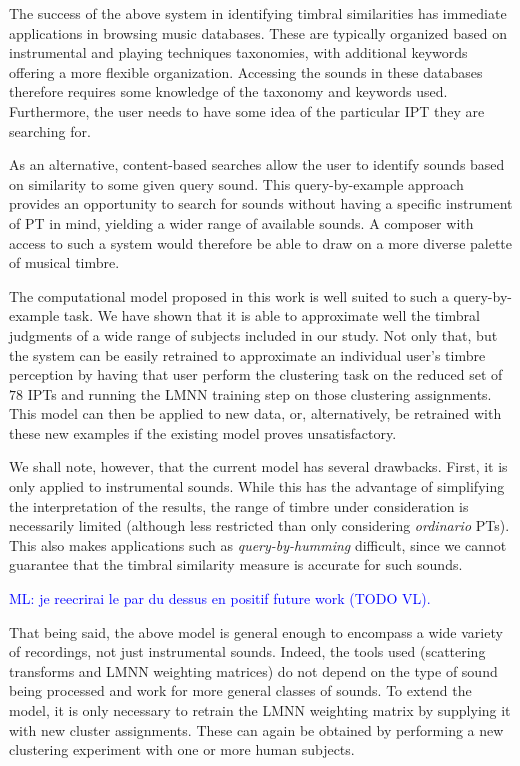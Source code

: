 \documentclass{bmcart}
\newcommand{\ml}[1]{\textcolor{blue}{ML: #1}\xspace}
\begin{document}
The success of the above system in identifying timbral similarities has immediate applications in browsing music databases.
These are typically organized based on instrumental and playing techniques taxonomies, with additional keywords offering a more flexible organization.
Accessing the sounds in these databases therefore requires some knowledge of the taxonomy and keywords used.
Furthermore, the user needs to have some idea of the particular IPT they are searching for.

As an alternative, content-based searches allow the user to identify sounds based on similarity to some given query sound.
This query-by-example approach provides an opportunity to search for sounds without having a specific instrument of PT in mind, yielding a wider range of available sounds.
A composer with access to such a system would therefore be able to draw on a more diverse palette of musical timbre.

The computational model proposed in this work is well suited to such a query-by-example task.
We have shown that it is able to approximate well the timbral judgments of a wide range of subjects included in our study.
Not only that, but the system can be easily retrained to approximate an individual user's timbre perception by having that user perform the clustering task on the reduced set of $78$ IPTs and running the LMNN training step on those clustering assignments.
This model can then be applied to new data, or, alternatively, be retrained with these new examples if the existing model proves unsatisfactory.

We shall note, however, that the current model has several drawbacks.
First, it is only applied to instrumental sounds.
While this has the advantage of simplifying the interpretation of the results, the range of timbre under consideration is necessarily limited (although less restricted than only considering \emph{ordinario} PTs).
This also makes applications such as \emph{query-by-humming} difficult, since we cannot guarantee that the timbral similarity measure is accurate for such sounds.

\ml{je reecrirai le par du dessus en positif future work (TODO VL).}

That being said, the above model is general enough to encompass a wide variety of recordings, not just instrumental sounds.
Indeed, the tools used (scattering transforms and LMNN weighting matrices) do not depend on the type of sound being processed and work for more general classes of sounds.
To extend the model, it is only necessary to retrain the LMNN weighting matrix by supplying it with new cluster assignments.
These can again be obtained by performing a new clustering experiment with one or more human subjects.
\end{document}
